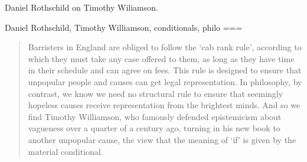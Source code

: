 Daniel Rothschild on Timothy Wiliamson.

Daniel Rothschild, Timothy Williamson, conditionals, philo
===
\begin{quote}
Barristers in England are obliged to follow the ‘cab rank rule’, according to which they must take any case offered to them, as long as they have time in their schedule and can agree on fees. This rule is designed to ensure that unpopular people and causes can get legal representation. In philosophy, by contrast, we know we need no structural rule to ensure that seemingly hopeless causes receive representation from the brightest minds. And so we find Timothy Williamson, who famously defended epistemicism about vagueness over a quarter of a century ago, turning in his new book to another unpopular cause, the view that the meaning of ‘if’ is given by the material conditional.
\end{quote}
\nocite{rothschild2023a}